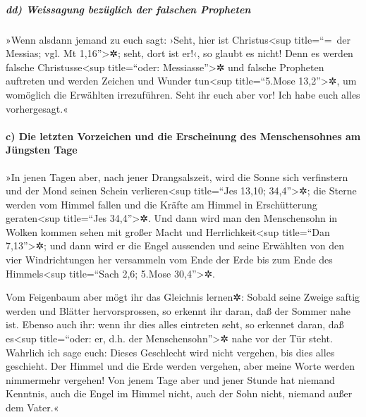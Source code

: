 \hypertarget{dd-weissagung-bezuxfcglich-der-falschen-propheten}{%
\subparagraph{dd) Weissagung bezüglich der falschen
Propheten}\label{dd-weissagung-bezuxfcglich-der-falschen-propheten}}

 »Wenn alsdann jemand zu euch sagt: ›Seht, hier ist
Christus\textless sup title=``=~der Messias; vgl. Mt
1,16''\textgreater✲; seht, dort ist er!‹, so glaubt es nicht!
 Denn es werden falsche Christusse\textless sup
title=``oder: Messiasse''\textgreater✲ und falsche Propheten auftreten
und werden Zeichen und Wunder tun\textless sup title=``5.Mose
13,2''\textgreater✲, um womöglich die Erwählten irrezuführen.
 Seht ihr euch aber vor! Ich habe euch alles
vorhergesagt.«

\hypertarget{c-die-letzten-vorzeichen-und-die-erscheinung-des-menschensohnes-am-juxfcngsten-tage}{%
\paragraph{c) Die letzten Vorzeichen und die Erscheinung des
Menschensohnes am Jüngsten
Tage}\label{c-die-letzten-vorzeichen-und-die-erscheinung-des-menschensohnes-am-juxfcngsten-tage}}

 »In jenen Tagen aber, nach jener Drangsalszeit, wird die
Sonne sich verfinstern und der Mond seinen Schein verlieren\textless sup
title=``Jes 13,10; 34,4''\textgreater✲;  die Sterne
werden vom Himmel fallen und die Kräfte am Himmel in Erschütterung
geraten\textless sup title=``Jes 34,4''\textgreater✲. 
Und dann wird man den Menschensohn in Wolken kommen sehen mit großer
Macht und Herrlichkeit\textless sup title=``Dan 7,13''\textgreater✲;
 und dann wird er die Engel aussenden und seine Erwählten
von den vier Windrichtungen her versammeln vom Ende der Erde bis zum
Ende des Himmels\textless sup title=``Sach 2,6; 5.Mose
30,4''\textgreater✲.

 Vom Feigenbaum aber mögt ihr das Gleichnis lernen✲:
Sobald seine Zweige saftig werden und Blätter hervorsprossen, so erkennt
ihr daran, daß der Sommer nahe ist.  Ebenso auch ihr:
wenn ihr dies alles eintreten seht, so erkennet daran, daß
es\textless sup title=``oder: er, d.h. der Menschensohn''\textgreater✲
nahe vor der Tür steht.  Wahrlich ich sage euch: Dieses
Geschlecht wird nicht vergehen, bis dies alles geschieht.
 Der Himmel und die Erde werden vergehen, aber meine
Worte werden nimmermehr vergehen!  Von jenem Tage aber
und jener Stunde hat niemand Kenntnis, auch die Engel im Himmel nicht,
auch der Sohn nicht, niemand außer dem Vater.«

